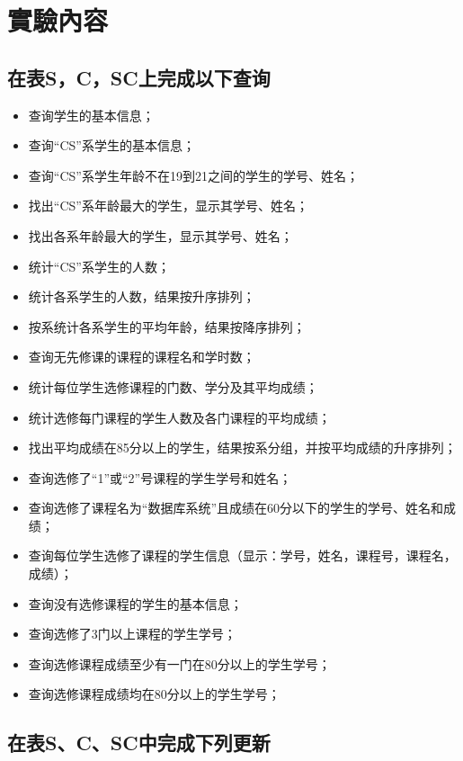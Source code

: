 \documentclass[12pt, a4paper]{report}
\begin{document}
\section{實驗內容}

\subsection{在表S，C，SC上完成以下查询}

\begin{itemize}
    \item 查询学生的基本信息；
    \item 查询“CS”系学生的基本信息；
    \item 查询“CS”系学生年龄不在19到21之间的学生的学号、姓名；
    \item 找出“CS”系年龄最大的学生，显示其学号、姓名；
    \item 找出各系年龄最大的学生，显示其学号、姓名；
    \item 统计“CS”系学生的人数；
    \item 统计各系学生的人数，结果按升序排列；
    \item 按系统计各系学生的平均年龄，结果按降序排列；
    \item 查询无先修课的课程的课程名和学时数；
    \item 统计每位学生选修课程的门数、学分及其平均成绩；
    \item 统计选修每门课程的学生人数及各门课程的平均成绩；
    \item 找出平均成绩在85分以上的学生，结果按系分组，并按平均成绩的升序排列；
    \item 查询选修了“1”或“2”号课程的学生学号和姓名；
    \item 查询选修了课程名为“数据库系统”且成绩在60分以下的学生的学号、姓名和成绩；
    \item 查询每位学生选修了课程的学生信息（显示：学号，姓名，课程号，课程名，成绩）；
    \item 查询没有选修课程的学生的基本信息；
    \item 查询选修了3门以上课程的学生学号；
    \item 查询选修课程成绩至少有一门在80分以上的学生学号；
    \item 查询选修课程成绩均在80分以上的学生学号；
\end{itemize}

\subsection{在表S、C、SC中完成下列更新}
\end{document}
